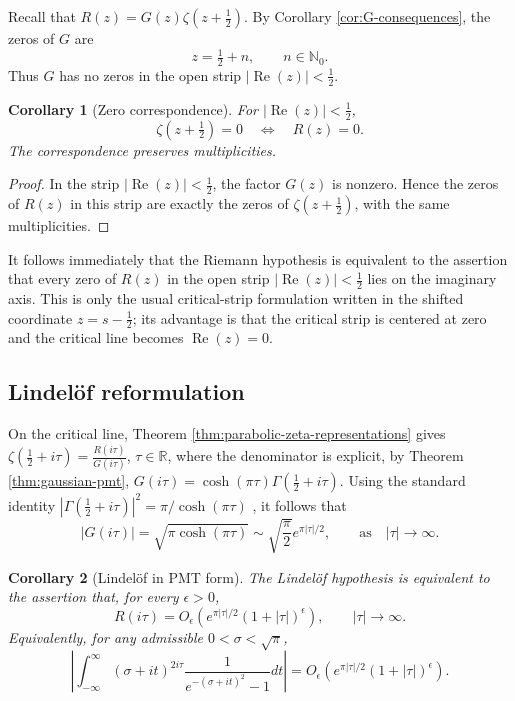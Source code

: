 \documentclass[12pt,english]{article}
\theoremstyle{plain} %
\newtheorem{corollary}{Corollary}
\theoremstyle{remark} %
\begin{document}
Recall that $R(z)=G(z)\zeta(z+\tfrac{1}{2})$.
By Corollary \ref{cor:G-consequences}, the zeros of $G$ are
$$
z=\tfrac{1}{2}+n,\qquad n\in\mathbb{N}_{0}.
$$
Thus $G$ has no zeros in the open strip $|\operatorname{Re}(z)|<\tfrac{1}{2}$.

\begin{corollary}[Zero correspondence]
\label{cor:R-zero-correspondence}
For $|\operatorname{Re}(z)|<\tfrac{1}{2}$,
\begin{equation}
\zeta(z+\tfrac{1}{2})=0
\quad\Leftrightarrow\quad
R(z)=0.
\label{eq:R-zeta-zero-correspondence}
\end{equation}
The correspondence preserves multiplicities.
\end{corollary}

\begin{proof}
In the strip $|\operatorname{Re}(z)|<\tfrac{1}{2}$, the factor $G(z)$ is nonzero. Hence the zeros of $R(z)$ in this strip
are exactly the zeros of $\zeta(z+\tfrac{1}{2})$, with the same multiplicities.
\end{proof}

It follows immediately that the Riemann hypothesis is equivalent to the assertion that every zero of $R(z)$ in the open strip $|\operatorname{Re}(z)|<\tfrac{1}{2}$ lies on the imaginary axis. This is only the usual critical-strip formulation written in the shifted coordinate $z=s-\tfrac{1}{2}$; its advantage is that the critical strip is centered at zero and the critical line becomes $\operatorname{Re}(z)=0$.




\subsection{Lindel\"of reformulation}
\label{subsec:lindelof-reformulation}

On the critical line, Theorem \ref{thm:parabolic-zeta-representations} gives
$\zeta(\tfrac{1}{2}+i\tau)=\frac{R(i\tau)}{G(i\tau)}$,
 $\tau\in\mathbb{R}$, where the denominator is explicit, by Theorem \ref{thm:gaussian-pmt},
$
G(i\tau)=\cosh(\pi\tau)\Gamma(\tfrac{1}{2}+i\tau)$. 
Using the standard identity $|\Gamma(\tfrac{1}{2}+i\tau)|^2=\pi/\cosh(\pi\tau)$
\cite[5.4.4]{DLMF}, it follows that
$$
|G(i\tau)|=\sqrt{\pi\cosh(\pi\tau)}
\sim \sqrt{\frac{\pi}{2}}e^{\pi|\tau|/2},
\qquad\text{as}\quad |\tau|\to\infty.
$$

\begin{corollary}[Lindel\"of in PMT form]
\label{cor:lindelof-pmt}
The Lindel\"of hypothesis is equivalent to the assertion that, for every
$\epsilon>0$,
$$
R(i\tau)
=
O_\epsilon\left(e^{\pi|\tau|/2}(1+|\tau|)^\epsilon\right),
\qquad |\tau|\to\infty.
$$
Equivalently, for any admissible $0<\sigma<\sqrt{\pi}$,
$$
\left|
\int_{-\infty}^{\infty}
(\sigma+it)^{2i\tau}
\frac{1}{e^{-(\sigma+it)^2}-1}dt
\right|
=
O_\epsilon\left(e^{\pi|\tau|/2}(1+|\tau|)^\epsilon\right).
$$
\end{corollary}
\end{document}
